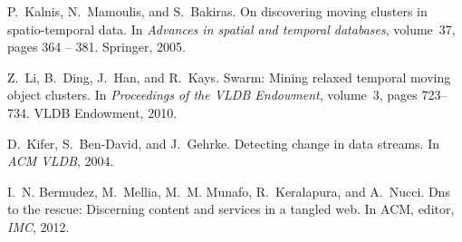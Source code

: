 \documentclass{acm_proc_article-sp}
\begin{document}
\begin{thebibliography}{10}
P.~Kalnis, N.~Mamoulis, and S.~Bakiras.
\newblock On discovering moving clusters in spatio-temporal data.
\newblock In {\em Advances in spatial and temporal databases}, volume~37, pages
  364 -- 381. Springer, 2005.

Z.~Li, B.~Ding, J.~Han, and R.~Kays.
\newblock Swarm: Mining relaxed temporal moving object clusters.
\newblock In {\em Proceedings of the VLDB Endowment}, volume~3, pages 723--734.
  VLDB Endowment, 2010.

D.~Kifer, S.~Ben-David, and J.~Gehrke.
\newblock Detecting change in data streams.
\newblock In {\em ACM VLDB}, 2004.

I.~N. Bermudez, M.~Mellia, M.~M. Munafo, R.~Keralapura, and A.~Nucci.
\newblock Dns to the rescue: Discerning content and services in a tangled web.
\newblock In ACM, editor, {\em IMC}, 2012.

\end{thebibliography}
\end{document}
